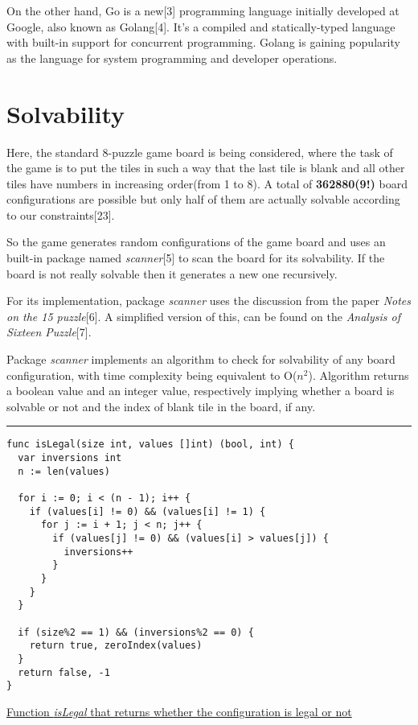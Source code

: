 \documentclass[a4paper]{article}
\begin{document}
\textrm{\normalsize{On the other hand, Go is a new[3] programming language initially developed at Google, also known
as Golang[4]. It's a compiled and statically-typed language with built-in support for concurrent
programming. Golang is gaining popularity as the language for system programming and developer
operations.\\}}

\section{Solvability}

\textrm{\normalsize{Here, the standard 8-puzzle game board is being considered, where the task of the game is to put
the tiles in such a way that the last tile is blank and all other tiles have numbers in increasing
order(from 1 to 8). A total of \textbf{362880(9!)} board configurations are possible but only half of them are
actually solvable according to our constraints[23].\\}}

\textrm{\normalsize{So the game generates random configurations of the game board and uses an built-in package
named \textit{scanner}[5] to scan the board for its solvability. If the board is not really solvable then it
generates a new one recursively.\\}}

\textrm{\normalsize{For its implementation, package \textit{scanner} uses the discussion from the paper \textit{Notes on the 15
puzzle}[6]. A simplified version of this, can be found on the \textit{Analysis of Sixteen Puzzle}[7].\\}}

\textrm{\normalsize{Package \textit{scanner} implements an algorithm to check for solvability of any board configuration, with
time complexity being equivalent to O($n^2$). Algorithm returns a boolean value and an integer value, respectively
implying whether a board is solvable or not and the index of blank tile in the board, if any.\\}}

\rule{\textwidth}{1pt}
\begin{verbatim}
func isLegal(size int, values []int) (bool, int) {
  var inversions int
  n := len(values)

  for i := 0; i < (n - 1); i++ {
    if (values[i] != 0) && (values[i] != 1) {
      for j := i + 1; j < n; j++ {
        if (values[j] != 0) && (values[i] > values[j]) {
          inversions++
        }
      }
    }
  }

  if (size%2 == 1) && (inversions%2 == 0) {
    return true, zeroIndex(values)
  }
  return false, -1
}
\end{verbatim}
\underline{Function \textit{isLegal} that returns whether the configuration is legal or not}
\end{document}
